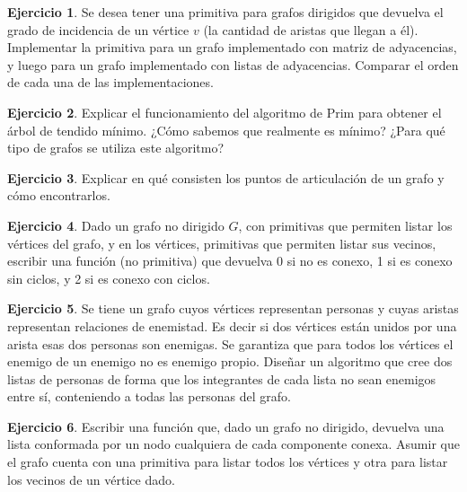 \documentclass[11pt,a4paper]{article}
\theoremstyle{definition}
\newtheorem{ejercicio}{Ejercicio}[section]
\begin{document}
\begin{ejercicio}
Se desea tener una primitiva para grafos dirigidos que devuelva el grado
de incidencia de un vértice $v$ (la cantidad de aristas que llegan a él).
Implementar la primitiva para un grafo implementado con matriz de
adyacencias, y luego para un grafo implementado con listas de adyacencias.
Comparar el orden de cada una de las implementaciones.
\end{ejercicio}

\begin{ejercicio}
Explicar el funcionamiento del algoritmo de Prim para obtener el árbol de
tendido mínimo. ¿Cómo sabemos que realmente es mínimo? ¿Para qué tipo de
grafos se utiliza este algoritmo?
\end{ejercicio}

\begin{ejercicio}
Explicar en qué consisten los puntos de articulación de un grafo y cómo
encontrarlos.
\end{ejercicio}

\begin{ejercicio}
Dado un grafo no dirigido $G$, con primitivas que permiten listar los
vértices del grafo, y en los vértices, primitivas que permiten listar sus
vecinos, escribir una función (no primitiva) que devuelva 0 si no es
conexo, 1 si es conexo sin ciclos, y 2 si es conexo con ciclos.
\end{ejercicio}

\begin{ejercicio}
Se tiene un grafo cuyos vértices representan personas y cuyas aristas
representan relaciones de enemistad. Es decir si dos vértices están unidos
por una arista esas dos personas son enemigas. Se garantiza que para todos
los vértices el enemigo de un enemigo no es enemigo propio. Diseñar un
algoritmo que cree dos listas de personas de forma que los integrantes de
cada lista no sean enemigos entre sí, conteniendo a todas las personas del
grafo.
\end{ejercicio}

\begin{ejercicio}
Escribir una función que, dado un grafo no dirigido, devuelva una lista
conformada por un nodo cualquiera de cada componente conexa.  Asumir que el
grafo cuenta con una primitiva para listar todos los vértices y otra para
listar los vecinos de un vértice dado.
\end{ejercicio}
\end{document}
